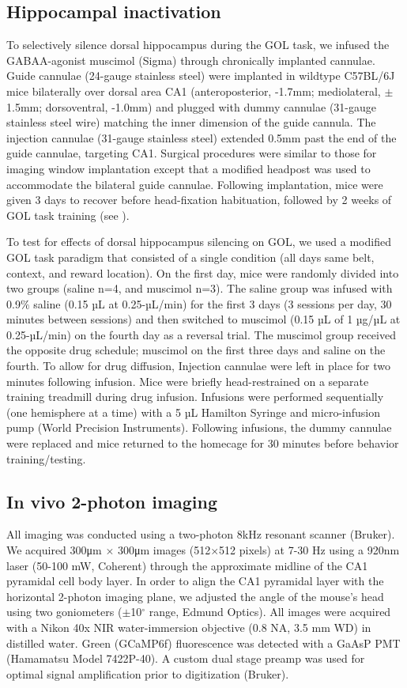 \subsection{Hippocampal inactivation}
To selectively silence dorsal hippocampus during the GOL task, we infused the GABAA-agonist muscimol (Sigma) through chronically implanted cannulae. Guide cannulae (24-gauge stainless steel) were implanted in wildtype C57BL/6J mice bilaterally over dorsal area CA1 (anteroposterior, -1.7mm; mediolateral, $\pm$1.5mm; dorsoventral, -1.0mm) and plugged with dummy cannulae (31-gauge stainless steel wire) matching the inner dimension of the guide cannula. The injection cannulae (31-gauge stainless steel) extended 0.5mm past the end of the guide cannulae, targeting CA1. Surgical procedures were similar to those for imaging window implantation except that a modified headpost was used to accommodate the bilateral guide cannulae. Following implantation, mice were given 3 days to recover before head-fixation habituation, followed by 2 weeks of GOL task training (see ).

To test for effects of dorsal hippocampus silencing on GOL, we used a modified GOL task paradigm that consisted of a single condition (all days same belt, context, and reward location). On the first day, mice were randomly divided into two groups (saline n=4, and muscimol n=3). The saline group was infused with 0.9$\%$ saline (0.15 µL at 0.25-µL/min) for the first 3 days (3 sessions per day, 30 minutes between sessions) and then switched to muscimol (0.15 µL of 1 µg/µL at 0.25-µL/min) on the fourth day as a reversal trial. The muscimol group received the opposite drug schedule; muscimol on the first three days and saline on the fourth. To allow for drug diffusion, Injection cannulae were left in place for two minutes following infusion. Mice were briefly head-restrained on a separate training treadmill during drug infusion. Infusions were performed sequentially (one hemisphere at a time) with a 5 µL Hamilton Syringe and micro-infusion pump (World Precision Instruments). Following infusions, the dummy cannulae were replaced and mice returned to the homecage for 30 minutes before behavior training/testing.

\subsection{In vivo 2-photon imaging}
All imaging was conducted using a two-photon 8kHz resonant scanner (Bruker). We acquired 300μm $\times$ 300μm images (512$\times$512 pixels) at 7-30 Hz using a 920nm laser (50-100 mW, Coherent) through the approximate midline of the CA1 pyramidal cell body layer.  In order to align the CA1 pyramidal layer with the horizontal 2-photon imaging plane, we adjusted the angle of the mouse’s head using two goniometers ($\pm$10$^{\circ}$ range, Edmund Optics).  All images were acquired with a Nikon 40x NIR water-immersion objective (0.8 NA, 3.5 mm WD) in distilled water. Green (GCaMP6f) fluorescence was detected with a GaAsP PMT (Hamamatsu Model 7422P-40). A custom dual stage preamp was used for optimal signal amplification prior to digitization (Bruker). 


